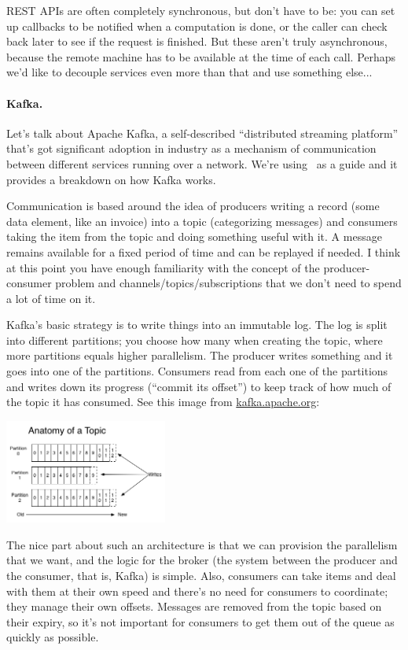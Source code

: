 \documentclass[a4paper]{report}
\begin{document}
REST APIs are often completely synchronous, but don't have to be: 
you can set up  callbacks to be notified when a computation is done, or
the caller can check back later to see if the request is finished. But these
aren't truly asynchronous, because the remote machine has to be available at
the time of each call. Perhaps we'd like to decouple services even more than
that and use something else...

\paragraph{Kafka.} 
Let's talk about Apache Kafka, a self-described ``distributed streaming platform'' that's got significant adoption in industry as a mechanism of communication between different services running over a network. We're using~\cite{kafka} as a guide and it provides a breakdown on how Kafka works.

Communication is based around the idea of producers writing a record (some data element, like an invoice) into a topic (categorizing messages) and consumers taking the item from the topic and doing something useful with it. A message remains available for a fixed period of time and can be replayed if needed. I think at this point you have enough familiarity with the concept of the producer-consumer problem and channels/topics/subscriptions that we don't need to spend a lot of time on it. 


Kafka's basic strategy is to write things into an immutable log. The log is split into different partitions; you choose how many when creating the topic, where more partitions equals higher parallelism. The producer writes something and it goes into one of the partitions. Consumers read from each one of the partitions and writes down its progress (``commit its offset'') to keep track of how much of the topic it has consumed.  See this image from \url{kafka.apache.org}:

\begin{center}
	\includegraphics[width=0.4\textwidth]{images/kafka-partition.png}
\end{center}

The nice part about such an architecture is that we can provision the parallelism that we want, and the logic for the broker (the system between the producer and the consumer, that is, Kafka) is simple. Also, consumers can take items and deal with them at their own speed and there's no need for consumers to coordinate; they manage their own offsets. Messages are removed from the topic based on their expiry, so it's not important for consumers to get them out of the queue as quickly as possible.
\end{document}
